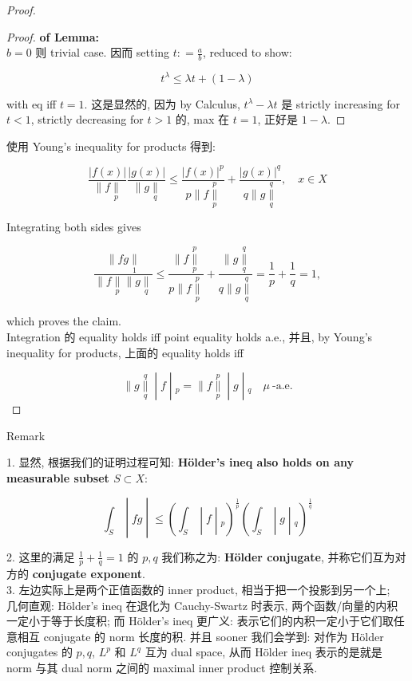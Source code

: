 \documentclass{qlnotes-export}
\begin{document}
\begin{proof}
\begin{proof}
\textbf{of Lemma:}\\
\(b = 0\) 则 trivial case. 因而 setting \(t: = \frac{a}{b}\), reduced to show:

\[t^{\lambda} \leq \lambda t + (1 - \lambda)\]

with eq iff \(t = 1\). 这是显然的, 因为 by Calculus, \(t^{\lambda} - \lambda t\) 是 strictly increasing for \(t < 1\), strictly decreasing for \(t > 1\) 的, max 在 \(t = 1\), 正好是 \(1 - \lambda\).

\end{proof}

使用 Young's inequality for products 得到:

\[\frac{|f(x)|}{\parallel f\underset{p}{\parallel}}\frac{|g(x)|}{\parallel g\underset{q}{\parallel}} \leq \frac{|f(x)|^{p}}{p \parallel f\underset{p}{\overset{p}{\parallel}}} + \frac{|g(x)|^{q}}{q \parallel g\underset{q}{\overset{q}{\parallel}}},\quad x \in X\]

Integrating both sides gives

\[\frac{\parallel fg\underset{1}{\parallel}}{\parallel f\underset{p}{\parallel} \parallel g\underset{q}{\parallel}} \leq \frac{\parallel f\underset{p}{\overset{p}{\parallel}}}{p \parallel f\underset{p}{\overset{p}{\parallel}}} + \frac{\parallel g\underset{q}{\overset{q}{\parallel}}}{q \parallel g\underset{q}{\overset{q}{\parallel}}} = \frac{1}{p} + \frac{1}{q} = 1,\]

which proves the claim.\\
Integration 的 equality holds iff point equality holds a.e., 并且, by Young's inequality for products, 上面的 equality holds iff

\[\left. \parallel g\underset{q}{\overset{q}{\parallel}} \middle| f \middle| {}_{p} = \parallel f\underset{p}{\overset{p}{\parallel}} \middle| g \middle| {}_{q}\quad\mu\ \text{-a.e.} \right.\]

\end{proof}

\begin{qlremark}{Remark}

1. 显然, 根据我们的证明过程可知: \textbf{Hölder's ineq also holds on any measurable subset \(S \subset X\)}:

\[\left. \int_{S} \middle| fg \middle| \leq (\int_{S} \middle| f \middle| {}_{p})^{\frac{1}{p}}(\int_{S} \middle| g \middle| {}_{q})^{\frac{1}{q}} \right.\]

2. 这里的满足 \(\frac{1}{p} + \frac{1}{q} = 1\) 的 \(p,q\) 我们称之为: \textbf{Hölder conjugate}, 并称它们互为对方的 \textbf{conjugate exponent}.\\
3. 左边实际上是两个正值函数的 inner product, 相当于把一个投影到另一个上;\\
几何直观: Hölder's ineq 在退化为 Cauchy-Swartz 时表示, 两个函数/向量的内积一定小于等于长度积; 而 Hölder's ineq 更广义: 表示它们的内积一定小于它们取任意相互 conjugate 的 norm 长度的积. 并且 sooner 我们会学到: 对作为 Hölder conjugates 的 \(p,q\), \(L^{p}\) 和 \(L^{q}\) 互为 dual space, 从而 Hölder ineq 表示的是就是 norm 与其 dual norm 之间的 maximal inner product 控制关系.

\end{qlremark}
\end{document}
